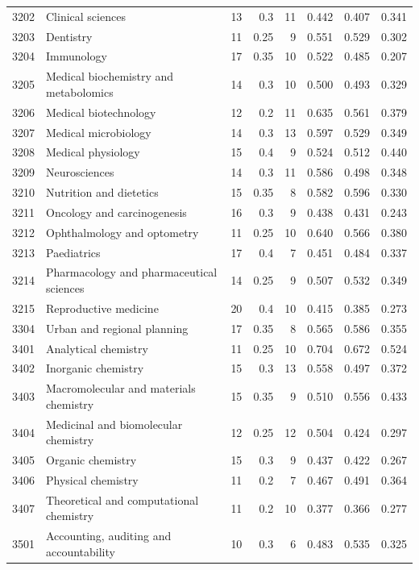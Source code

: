 \begin{longtable}{r p{3.35cm} rr r rrr}
3202 & Clinical sciences & 13 & 0.3 & 11 & 0.442 & 0.407 & 0.341 \\
3203 & Dentistry & 11 & 0.25 & 9 & 0.551 & 0.529 & 0.302 \\
3204 & Immunology & 17 & 0.35 & 10 & 0.522 & 0.485 & 0.207 \\
3205 & Medical biochemistry and metabolomics & 14 & 0.3 & 10 & 0.500 & 0.493 & 0.329 \\
3206 & Medical biotechnology & 12 & 0.2 & 11 & 0.635 & 0.561 & 0.379 \\
3207 & Medical microbiology & 14 & 0.3 & 13 & 0.597 & 0.529 & 0.349 \\
3208 & Medical physiology & 15 & 0.4 & 9 & 0.524 & 0.512 & 0.440 \\
3209 & Neurosciences & 14 & 0.3 & 11 & 0.586 & 0.498 & 0.348 \\
3210 & Nutrition and dietetics & 15 & 0.35 & 8 & 0.582 & 0.596 & 0.330 \\
3211 & Oncology and carcinogenesis & 16 & 0.3 & 9 & 0.438 & 0.431 & 0.243 \\
3212 & Ophthalmology and optometry & 11 & 0.25 & 10 & 0.640 & 0.566 & 0.380 \\
3213 & Paediatrics & 17 & 0.4 & 7 & 0.451 & 0.484 & 0.337 \\
3214 & Pharmacology and pharmaceutical sciences & 14 & 0.25 & 9 & 0.507 & 0.532 & 0.349 \\
3215 & Reproductive medicine & 20 & 0.4 & 10 & 0.415 & 0.385 & 0.273 \\
3304 & Urban and regional planning & 17 & 0.35 & 8 & 0.565 & 0.586 & 0.355 \\
3401 & Analytical chemistry & 11 & 0.25 & 10 & 0.704 & 0.672 & 0.524 \\
3402 & Inorganic chemistry & 15 & 0.3 & 13 & 0.558 & 0.497 & 0.372 \\
3403 & Macromolecular and materials chemistry & 15 & 0.35 & 9 & 0.510 & 0.556 & 0.433 \\
3404 & Medicinal and biomolecular chemistry & 12 & 0.25 & 12 & 0.504 & 0.424 & 0.297 \\
3405 & Organic chemistry & 15 & 0.3 & 9 & 0.437 & 0.422 & 0.267 \\
3406 & Physical chemistry & 11 & 0.2 & 7 & 0.467 & 0.491 & 0.364 \\
3407 & Theoretical and computational chemistry & 11 & 0.2 & 10 & 0.377 & 0.366 & 0.277 \\
3501 & Accounting, auditing and accountability & 10 & 0.3 & 6 & 0.483 & 0.535 & 0.325 \\

\end{longtable}
